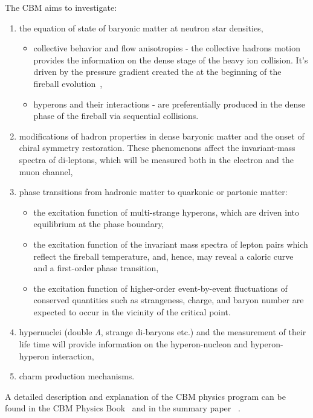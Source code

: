 The \gls{CBM} aims to investigate:
\begin{enumerate}
    \item the equation of state of baryonic matter at neutron star densities,
    \begin{itemize}
        \item collective behavior and flow anisotropies - the collective hadrons motion provides the information on the dense stage of the heavy ion collision. It's driven by the pressure gradient created the at the beginning of the fireball evolution~\cite{Reisdorf_2007},
        \item hyperons and their interactions - are preferentially produced in the dense phase of the fireball via sequential collisions.
    \end{itemize}
    \item modifications of hadron properties in dense baryonic matter and the onset of chiral symmetry restoration. These phenomenons affect the invariant-mass spectra of di-leptons, which will be measured both in the electron and the muon channel,
    \item phase transitions from hadronic matter to quarkonic or partonic matter:
    \begin{itemize}
        \item the excitation function of multi-strange hyperons, which are driven into equilibrium at the phase boundary,
        \item the excitation function of the invariant mass spectra of lepton pairs which reflect the fireball temperature, and, hence, may reveal a caloric curve and a first-order phase transition,
        \item the excitation function of higher-order event-by-event fluctuations of conserved quantities such as strangeness, charge, and baryon number are expected to occur in the vicinity of the critical point.
    \end{itemize}

     
     
    \item hypernuclei (double $\Lambda$, strange di-baryons etc.) and the measurement of their life time will provide information on the hyperon-nucleon and hyperon-hyperon interaction,
    \item charm production mechanisms.
\end{enumerate}
A detailed description and explanation of the \gls{CBM} physics program can be found in the \gls{CBM} Physics Book~\cite{CBM_physics} and in the summary paper~
\cite{Ablyazimov_2017}.



